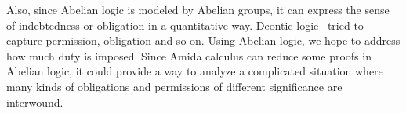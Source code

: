 Also, since Abelian logic is modeled by Abelian groups, it can express the
sense of indebtedness or obligation in a quantitative way.
Deontic logic~\citep{von1951deontic,sep-logic-deontic} tried to capture permission,
obligation and so on.
Using Abelian logic, we hope to address how much duty is imposed.
Since Amida calculus can reduce some proofs in Abelian logic, it could
provide a way to analyze a complicated situation where many kinds of
obligations and permissions of different significance are interwound.

